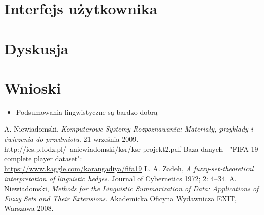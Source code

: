\documentclass{classrep}
\begin{document}
\section{Interfejs użytkownika}

\section{Dyskusja}

\section{Wnioski}
\begin{itemize}
\item Podsumowania lingwistyczne są bardzo dobrą 
\end{itemize}

\begin{thebibliography}{}
    A. Niewiadomski,
    \emph{Komputerowe Systemy Rozpoznawania: Materiały, przykłady i ćwiczenia do przedmiotu}.
    21 września 2009.
    http://ics.p.lodz.pl/~aniewiadomski/ksr/ksr-projekt2.pdf
    Baza danych - "FIFA 19 complete player dataset":\\
    \url{https://www.kaggle.com/karangadiya/fifa19}    
    L. A. Zadeh,
    \emph{A fuzzy-set-theoretical interpretation of linguistic hedges}.
    Journal of Cybernetics 1972; 2: 4–34.
    A. Niewiadomski,
    \emph{Methods for the Linguistic Summarization of Data: Applications of Fuzzy Sets and Their Extensions}.
    Akademicka Oficyna Wydawnicza EXIT,
    Warszawa 2008.
    
\end{thebibliography}
\end{document}
